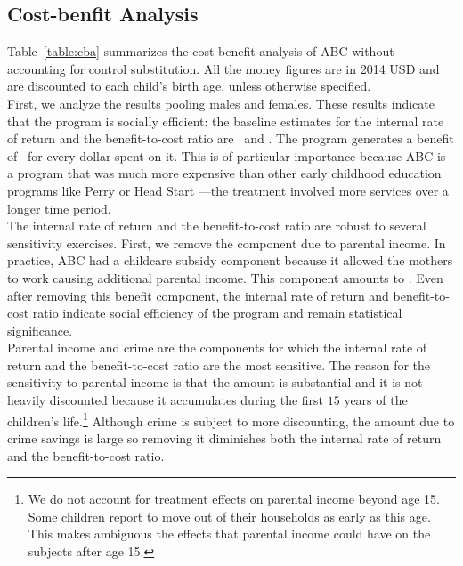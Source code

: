 \subsection{Cost-benfit Analysis} \label{section:cbaresults}

\noindent Table~\ref{table:cba} summarizes the cost-benefit analysis of ABC without accounting for control substitution. All the money figures are in 2014 USD and are discounted to each child's birth age, unless otherwise specified.\\

\noindent First, we analyze the results pooling males and females. These results indicate that the program is socially efficient: the baseline estimates for the internal rate of return and the benefit-to-cost ratio are \irrp\ and \bcp. The program generates a benefit of \bcp\ for every dollar spent on it. This is of particular importance because ABC is a program that was much more expensive than other early childhood education programs like Perry or Head Start \citep{Elango_Hojman_etal_2016_Early-Edu}---the treatment involved more services over a longer time period. \\ 

\noindent The internal rate of return and the benefit-to-cost ratio are robust to several sensitivity exercises. First, we remove the component due to parental income. In practice, ABC had a childcare subsidy component because it allowed the mothers to work causing additional parental income. This component amounts to \parincomenpvp. Even after removing this benefit component, the internal rate of return and benefit-to-cost ratio indicate social efficiency of the program and remain statistical significance.\\ 

\noindent Parental income and crime are the components for which the internal rate of return and the benefit-to-cost ratio are the most sensitive. The reason for the sensitivity to parental income is that the amount is substantial and it is not heavily discounted because it accumulates during the first $15$ years of the children's life.\footnote{We do not account for treatment effects on parental income beyond age 15. Some children report to move out of their households as early as this age. This makes ambiguous the effects that parental income could have on the subjects after age 15.} Although crime is subject to more discounting, the amount due to crime savings is large so removing it diminishes both the internal rate of return and the benefit-to-cost ratio.\\ 

